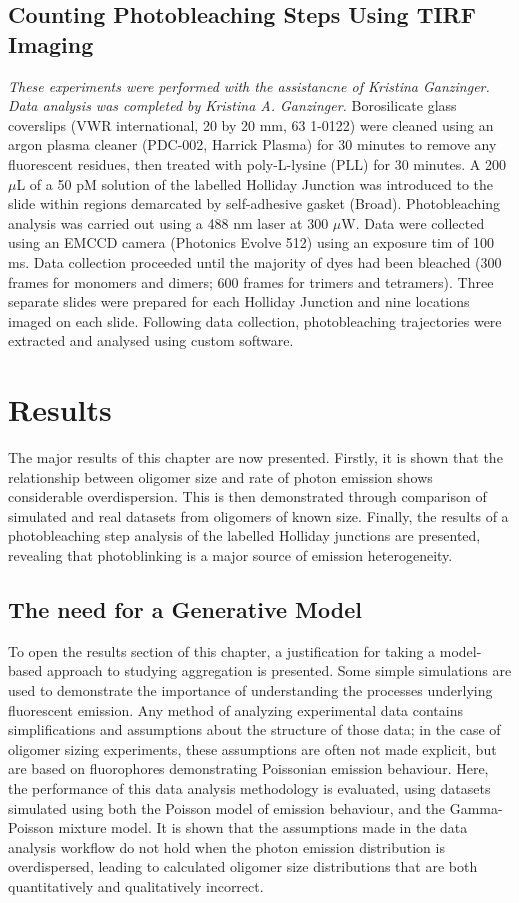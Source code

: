 \subsection{Counting Photobleaching Steps Using TIRF Imaging}
\textit{These experiments were performed with the assistancne of Kristina Ganzinger. Data analysis was completed by Kristina A. Ganzinger.}
Borosilicate glass coverslips (VWR international, 20 by 20 mm, 63 1-0122) were cleaned using an argon plasma cleaner (PDC-002, Harrick Plasma) for 30 minutes to remove any fluorescent residues, then treated with poly-L-lysine (PLL) for 30 minutes. A 200 $\mu$L of a 50 pM solution of the labelled Holliday Junction was introduced to the slide within regions demarcated by self-adhesive gasket (Broad). Photobleaching analysis was carried out using a 488 nm laser at 300 $\mu$W. Data were collected using an EMCCD camera (Photonics Evolve 512) using an exposure tim of 100 ms. Data collection proceeded until the majority of dyes had been bleached (300 frames for monomers and dimers; 600 frames for trimers and tetramers). Three separate slides were prepared for each Holliday Junction and nine locations imaged on each slide. Following data collection, photobleaching trajectories were extracted and analysed using custom software.

\section{Results}
The major results of this chapter are now presented. Firstly, it is shown that the relationship between oligomer size and rate of photon emission shows considerable overdispersion. This is then demonstrated through comparison of simulated and real datasets from oligomers of known size. Finally, the results of a photobleaching step analysis of the labelled Holliday junctions are presented, revealing that photoblinking is a major source of emission heterogeneity.

\subsection{The need for a Generative Model}
\label{sect:generative_model}
To open the results section of this chapter, a justification for taking a model-based approach to studying aggregation is presented. Some simple simulations are used to demonstrate the importance of understanding the processes underlying fluorescent emission. Any method of analyzing experimental data contains simplifications and assumptions about the structure of those data; in the case of oligomer sizing experiments, these assumptions are often not made explicit, but are based on fluorophores demonstrating Poissonian emission behaviour. Here, the performance of this data analysis methodology is evaluated, using datasets simulated using both the Poisson model of emission behaviour, and the Gamma-Poisson mixture model. It is shown that the assumptions made in the data analysis workflow do not hold when the photon emission distribution is overdispersed, leading to calculated oligomer size distributions that are both quantitatively and qualitatively incorrect. 

